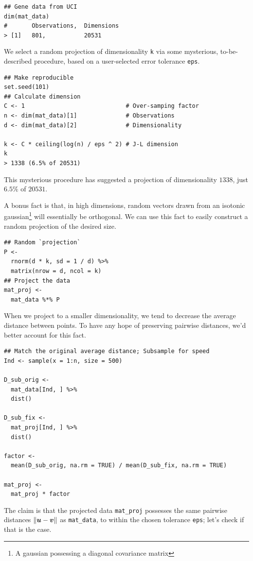 \documentclass{article}
\begin{document}
\begin{lstlisting}
## Gene data from UCI
dim(mat_data)
#       Observations,  Dimensions
> [1]   801,           20531
\end{lstlisting}

We select a random projection of dimensionality \lstinline{k} via some
mysterious, to-be-described procedure, based on a user-selected error tolerance
\lstinline{eps}.

\begin{lstlisting}
## Make reproducible
set.seed(101)
## Calculate dimension
C <- 1                             # Over-samping factor
n <- dim(mat_data)[1]              # Observations
d <- dim(mat_data)[2]              # Dimensionality

k <- C * ceiling(log(n) / eps ^ 2) # J-L dimension
k
> 1338 (6.5% of 20531)
\end{lstlisting}

This mysterious procedure has suggested a projection of dimensionality $1338$,
just $6.5\%$ of $20531$.

A bonus fact is that, in high dimensions, random vectors drawn from an isotonic
gaussian\footnote{A gaussian possessing a diagonal covariance matrix} will
essentially be orthogonal.\cite{ailon2009fast} We can use this fact to easily
construct a random projection of the desired size.

\begin{lstlisting}
## Random `projection`
P <-
  rnorm(d * k, sd = 1 / d) %>%
  matrix(nrow = d, ncol = k)
## Project the data
mat_proj <-
  mat_data %*% P
\end{lstlisting}

When we project to a smaller dimensionality, we tend to decrease the average
distance between points. To have any hope of preserving pairwise distances, we'd
better account for this fact.

\begin{lstlisting}
## Match the original average distance; Subsample for speed
Ind <- sample(x = 1:n, size = 500)

D_sub_orig <-
  mat_data[Ind, ] %>%
  dist()

D_sub_fix <-
  mat_proj[Ind, ] %>%
  dist()

factor <-
  mean(D_sub_orig, na.rm = TRUE) / mean(D_sub_fix, na.rm = TRUE)

mat_proj <-
  mat_proj * factor
\end{lstlisting}

The claim is that the projected data \lstinline{mat_proj} possesses the same
pairwise distances $\|\boldsymbol{u}-\boldsymbol{v}\|$ as \lstinline{mat_data}, to within the chosen
tolerance \lstinline{eps}; let's check if that is the case.
\end{document}

